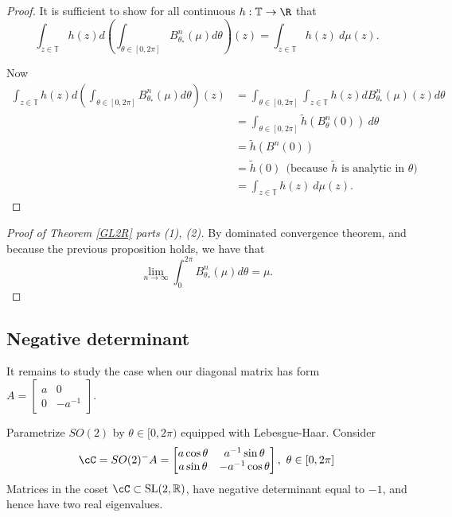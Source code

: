 \documentclass[10pt]{amsart}
\numberwithin{equation}{section}     %
\newcommand{\T}{\mathbb{T}}
\newcommand{\cP}{\mathcal{P}}\newcommand{\cQ}{\mathcal{Q}}\newcommand{\cR}{\mathcal{R}}
\newcommand{\SL}{\mathrm{SL}}
\begin{document}
\begin{proof}
   It is sufficient to show for all continuous $h:\T \to \R$ that $$\int_{z \in \T} h(z) d\left( \int_{\theta \in [0,2\pi]} B^n_{\theta_*}(\mu) d\theta \right) (z)= \int_{z \in \T} h(z) \ d\mu(z).$$

   Now \begin{align*}
      \int_{z \in \T} h(z) d\left( \int_{\theta \in [0,2\pi]} B^n_{\theta_*}(\mu) d\theta \right) (z) 
       &=\int_{\theta \in [0,2\pi]}  \int_{z \in \T} h(z) d B^n_{\theta_*}(\mu)  (z) d\theta
       \\
       &= \int_{\theta \in [0,2\pi]} \tilde{h}(B^n_{\theta}(0))  \ d\theta \\
       &= \tilde{h}(B^n(0)) \\ 
       &= \tilde{h}(0) \ \ \text{(because } \tilde{h} \text{ is analytic in } \theta )\\
       &= \int_{z \in \T} h(z) \ d\mu(z).
   \end{align*}

\end{proof}

\begin{proof}[Proof of Theorem \ref{GL2R} parts \textit{(1), (2)}]
   By dominated convergence theorem, and because the previous proposition holds, we have that $$\lim \limits_{n\to \infty} \int_0^{2\pi} B^n_{\theta_*}(\mu) d\theta = \mu.$$
\end{proof}


\subsection{Negative determinant}




It remains to study the case when our diagonal matrix has form  $A = \begin{bmatrix}
    a & 0 \\
    0 & -a ^ {-1}
\end{bmatrix}$. 


Parametrize $SO(2)$ by $\theta \in [0,2\pi)$ equipped with Lebesgue-Haar.  Consider $$ \cC = SO(2)^-A 
= \begin{bmatrix}
    a\cos \theta & a^{-1} \sin \theta \\
    a\sin \theta & -a^{-1}\cos \theta
\end{bmatrix}, \ \theta \in [0,2\pi]$$
Matrices in the coset $\cC \subset\SL(2,\mathbb{R})$, have negative determinant equal to $-1$, and hence have two real eigenvalues. 
\end{document}
